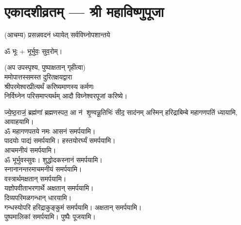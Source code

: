 
\setlength{\parindent}{0pt}
\chapter[एकादशीव्रतम्]{एकादशीव्रतम् — श्री महाविष्णुपूजा}


(आचम्य)
{प्रसन्नवदनं ध्यायेत् सर्वविघ्नोपशान्तये}
 
ॐ भूः + भूर्भुवः॒ सुव॒रोम्।
 
(अप उपस्पृश्य, पुष्पाक्षतान् गृहीत्वा)\\
ममोपात्तस्समस्त दुरितक्षयद्वारा \\
श्रीपरमेश्वरप्रीत्यर्थं करिष्यमाणस्य कर्मणः\\
 निर्विघ्नेन परिसमाप्त्यर्थम् आदौ विघ्नेश्वरपूजां करिष्ये।

{ज्ये॒ष्ठ॒राजं॒ ब्रह्म॑णां ब्रह्मणस्पत॒ आ न॑ शृ॒ण्वन्नू॒तिभिः॑ सीद॒ साद॑नम्}
अस्मिन् हरिद्राबिम्बे महागणपतिं ध्यायामि, आवाहयामि।\\


ॐ महागणपतये नमः  आसनं समर्पयामि।\\
पादयोः पाद्यं समर्पयामि। हस्तयोरर्घ्यं समर्पयामि।\\
आचमनीयं समर्पयामि।\\
ॐ भूर्भुवस्सुवः। शुद्धोदकस्नानं समर्पयामि।\\
स्नानानन्तरमाचमनीयं समर्पयामि।\\
वस्त्रार्थमक्षतान् समर्पयामि।\\
यज्ञोपवीताभरणार्थे अक्षतान् समर्पयामि।\\
दिव्यपरिमळगन्धान् धारयामि।\\
गन्धस्योपरि हरिद्राकुङ्कुमं समर्पयामि। अक्षतान् समर्पयामि। \\
पुष्पमालिकां समर्पयामि। पुष्पैः पूजयामि।

